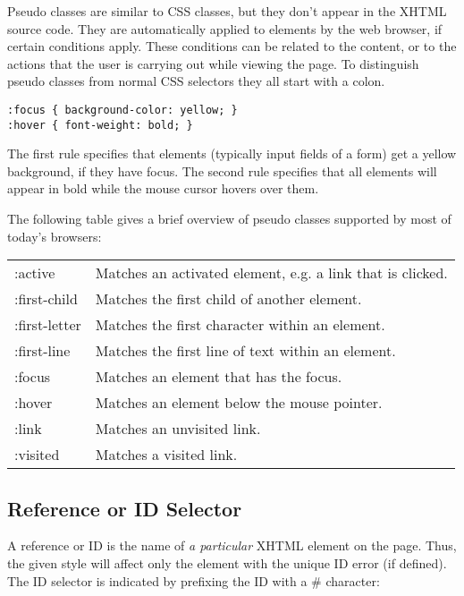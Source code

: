 \documentclass[a4paper,10pt,twoside]{book}
\newcommand{\ct}[1]{{\small\ttfamily\textup{#1}}}
\begin{document}
Pseudo classes are similar to CSS classes, but they don't appear in the XHTML source code. They are automatically applied to elements by the web browser, if certain conditions apply. These conditions can be related to the content, or to the actions that the user is carrying out while viewing the page. To distinguish pseudo classes from normal CSS selectors they all start with a colon.

\begin{lstlisting}
:focus { background-color: yellow; }
:hover { font-weight: bold; }
\end{lstlisting}

The first rule specifies that elements (typically input fields of a form) get a yellow background, if they have focus. The second rule specifies that all elements will appear in bold while the mouse cursor hovers over them.

The following table gives a brief overview of pseudo classes supported by most of today's browsers:

\begin{tabularx}{\textwidth}{lX}
 \ct{:active} & Matches an activated element, e.g. a link that is clicked.\\
 \ct{:first-child} & Matches the first child of another element.\\
 \ct{:first-letter} & Matches the first character within an element.\\
 \ct{:first-line} & Matches the first line of text within an element.\\
 \ct{:focus} & Matches an element that has the focus.\\
 \ct{:hover} & Matches an element below the mouse pointer.\\
 \ct{:link} & Matches an unvisited link.\\
 \ct{:visited} & Matches a visited link.\\
\end{tabularx}

\subsection{Reference or ID Selector}
\label{book:fundamentals:css:selectors:reference}

A reference or ID is the name of \textit{a particular} XHTML element on the page. Thus, the given style will affect only the element with the unique ID \ct{error} (if defined). The ID selector is indicated by prefixing the ID with a \ct{\#} character:
\end{document}
